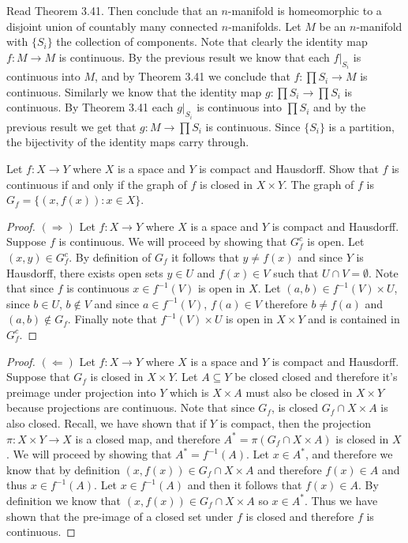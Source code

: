 \documentclass[minion]{homework651}
\begin{document}
\begin{problems}
\begin{subproblems}
\item Read Theorem 3.41.  Then conclude that an $n$-manifold is homeomorphic
to a disjoint union of countably many connected $n$-manifolds.
\solution Let $M$ be an $n$-manifold with $\{S_i\}$ the collection of components.
Note that clearly the identity map $f:M \to M$ is continuous. By the previous result we know that 
each $f|_{S_i}$ is continuous into $M$, and by Theorem 3.41 we conclude that $f:\prod S_i \to M$
is continuous. Similarly we know that the identity map $g:\prod S_i \to \prod S_i$ is continuous. By 
Theorem 3.41 each $g|_{S_i}$ is continuous into $\prod S_i$ and by the previous result we get that 
$g: M \to \prod S_i$ is continuous. Since $\{S_i\}$ is a partition, the bijectivity of the identity maps carry through. 
\end{subproblems}





\problem Let $f:X\rightarrow Y$ where $X$ is a space and $Y$ is compact and Hausdorff.  Show that
$f$ is continuous if and only if the graph of $f$ is closed in $X\times Y$.  The graph
of $f$ is $G_f=\{(x,f(x)):x\in X\}$.
\begin{proof} $(\Rightarrow)$ Let $f:X\rightarrow Y$ where $X$ is a space and $Y$ is compact and Hausdorff. Suppose 
    $f$ is continuous. We will proceed by showing that $G_f^c$ is open. Let $(x, y) \in G_f^c$. By definition of 
    $G_f$ it follows that $y \neq f(x)$ and since $Y$ is Hausdorff, there exists open sets $y \in U$ and $f(x) \in V$ 
    such that $U \cap V = \emptyset$. Note that since $f$ is continuous $x \in f^{-1}(V)$ is open in $X$.
    Let $(a, b) \in f^{-1}(V) \times U$, since $b \in U$, $b \not\in V$ and since $a \in f^{-1}(V)$, $f(a) \in V$
    therefore $b \neq f(a)$ and $(a, b) \not\in G_f$. Finally note that $f^{-1}(V) \times U$ is open in $X \times Y$ and is contained in $G_f^c$.
\end{proof}

\begin{proof} $(\Leftarrow)$ Let $f:X\rightarrow Y$ where $X$ is a space and $Y$ is compact and Hausdorff. Suppose that
    $G_f$ is closed in $X\times Y$. Let $A \subseteq Y$ be closed closed and therefore it's preimage under 
    projection into $Y$ which is $X \times A$ must also be closed in $X \times Y$ because projections are continuous.
    Note that since $G_f$, is closed $G_f \cap X \times A$ is also closed. Recall, we have shown that if $Y$ is compact, then 
    the projection $\pi: X \times Y \to X$ is a closed map, and therefore $A^* = \pi(G_f \cap X \times A)$ is closed in $X$.
    We will proceed by showing that $A^* = f^{-1}(A)$. Let $x \in A^*$, and therefore we know that by definition $(x, f(x)) \in G_f \cap X \times A$
    and therefore $f(x) \in A$ and thus $x \in f^{-1}(A)$. Let $x \in f^{-1}(A)$ and then it follows that $f(x) \in A$. By definition we know that $(x , f(x)) \in  G_f \cap X \times A$
    so $x \in A^*$. Thus we have shown that the pre-image of a closed set under $f$ is closed and therefore $f$ is continuous. 
\end{proof}





\end{problems}
\end{document}

